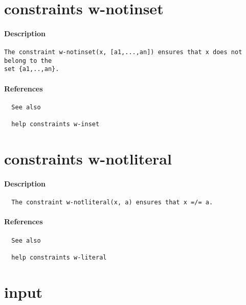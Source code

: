 \section{constraints w-notinset}
\paragraph{Description}
{\footnotesize
\begin{verbatim}
The constraint w-notinset(x, [a1,...,an]) ensures that x does not belong to the
set {a1,..,an}.
\end{verbatim}
}
\paragraph{References}
{\footnotesize
\begin{verbatim}
  See also

  help constraints w-inset
\end{verbatim}
}
\section{constraints w-notliteral}
\paragraph{Description}
{\footnotesize
\begin{verbatim}
  The constraint w-notliteral(x, a) ensures that x =/= a.
\end{verbatim}
}
\paragraph{References}
{\footnotesize
\begin{verbatim}
  See also

  help constraints w-literal
\end{verbatim}
}
\section{input}
